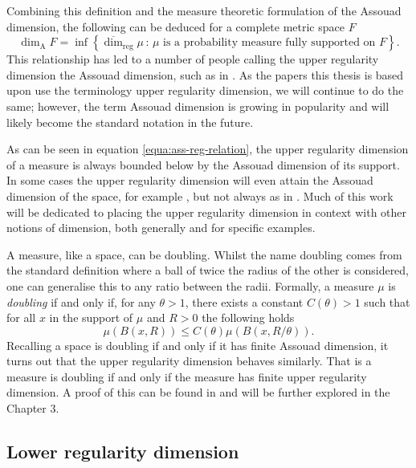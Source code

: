 Combining this definition and the measure theoretic formulation of the Assouad dimension, the following can be deduced for a complete metric space $F$
\begin{equation}\label{equa:ass-reg-relation}
    \dim_{\text{A}} F = \inf \left\{ \overline{\dim}_{\text{reg}} \mu \,  \colon \, \mu \text{ is a probability measure fully supported on } F\right\}.
\end{equation}
This relationship has led to a number of people calling the upper regularity dimension the Assouad dimension, such as in \cite{hare-hare-tros, hare-troscheit, fraser-kaenmaki-proj}. As the papers this thesis is based upon use the terminology upper regularity dimension, we will continue to do the same; however, the term Assouad dimension is growing in popularity and will likely become the standard notation in the future.

As can be seen in equation \eqref{equa:ass-reg-relation}, the upper regularity dimension of a measure is always bounded below by the Assouad dimension of its support. In some cases the upper regularity dimension will even attain the Assouad dimension of the space, for example \cite[Theorem 2.3]{fraser-howroyd1}, but not always as in \cite{anti2}. Much of this work will be dedicated to placing the upper regularity dimension in context with other notions of dimension, both generally and for specific examples.

A measure, like a space, can be doubling. Whilst the name doubling comes from the standard definition where a ball of twice the radius of the other is considered, one can generalise this to any ratio between the radii. Formally, a measure $\mu$ is \textit{doubling} if and only if, for any $\theta > 1$, there exists a constant $C(\theta) > 1$ such that for all $x$ in the support of $\mu$ and $R > 0$ the following holds
\[
\mu(B(x,R)) \le C(\theta) \mu(B(x,R/\theta)).
\]
Recalling a space is doubling if and only if it has finite Assouad dimension, it turns out that the upper regularity dimension behaves similarly. That is a measure is doubling if and only if the measure has finite upper regularity dimension. A proof of this can be found in \cite[Lemma 3.2]{kaenmakinew} and will be further explored in the Chapter 3. 


\subsection{Lower regularity dimension}
\label{sec:intro-lower-reg}


